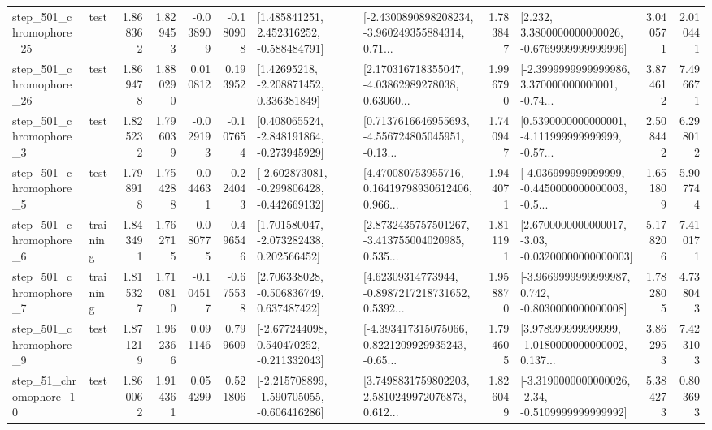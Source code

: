 \begin{tabular}{llrrrrllrlrr}
  step\_501\_chromophore\_25 &      test &      1.868362 &    1.829453 &     -0.038909 & -0.180908 &    [1.485841251, 2.452316252, -0.588484791] &  [-2.4300890898208234, -3.960249355884314, 0.71... &       1.783847 &   [2.232, 3.3800000000000026, -0.6769999999999996] &            3.040571 &          2.010441 \\
  step\_501\_chromophore\_26 &      test &      1.869478 &    1.880290 &      0.010812 &  0.193952 &     [1.42695218, -2.208871452, 0.336381849] &  [2.170316718355047, -4.03862989278038, 0.63060... &       1.996790 &  [-2.3999999999999986, 3.370000000000001, -0.74... &            3.874612 &          7.496671 \\
   step\_501\_chromophore\_3 &      test &      1.825232 &    1.796039 &     -0.029193 & -0.107654 &   [0.408065524, -2.848191864, -0.273945929] &  [0.7137616646955693, -4.556724805045951, -0.13... &       1.740947 &  [0.5390000000000001, -4.111999999999999, -0.57... &            2.508442 &          6.298012 \\
   step\_501\_chromophore\_5 &      test &      1.798918 &    1.754288 &     -0.044631 & -0.224043 &  [-2.602873081, -0.299806428, -0.442669132] &  [4.470080753955716, 0.16419798930612406, 0.966... &       1.944071 &  [-4.036999999999999, -0.4450000000000003, -0.5... &            1.651809 &          5.907744 \\
   step\_501\_chromophore\_6 &  training &      1.843491 &    1.762715 &     -0.080775 & -0.496546 &    [1.701580047, -2.073282438, 0.202566452] &  [2.8732435757501267, -3.413755004020985, 0.535... &       1.811191 &  [2.6700000000000017, -3.03, -0.03200000000000003] &            5.178206 &          7.410171 \\
   step\_501\_chromophore\_7 &  training &      1.815327 &    1.710810 &     -0.104517 & -0.675538 &    [2.706338028, -0.506836749, 0.637487422] &  [4.62309314773944, -0.8987217218731652, 0.5392... &       1.958870 &  [-3.9669999999999987, 0.742, -0.8030000000000008] &            1.782805 &          4.738043 \\
   step\_501\_chromophore\_9 &      test &      1.871219 &    1.962366 &      0.091146 &  0.799609 &   [-2.677244098, 0.540470252, -0.211332043] &  [-4.393417315075066, 0.8221209929935243, -0.65... &       1.794605 &  [3.978999999999999, -1.0180000000000002, 0.137... &            3.862953 &          7.423103 \\
   step\_51\_chromophore\_10 &      test &      1.860062 &    1.914361 &      0.054299 &  0.521806 &  [-2.215708899, -1.590705055, -0.606416286] &  [3.7498831759802203, 2.5810249972076873, 0.612... &       1.826049 &  [-3.3190000000000026, -2.34, -0.5109999999999992] &            5.384273 &          0.803693 \\

\end{tabular}

